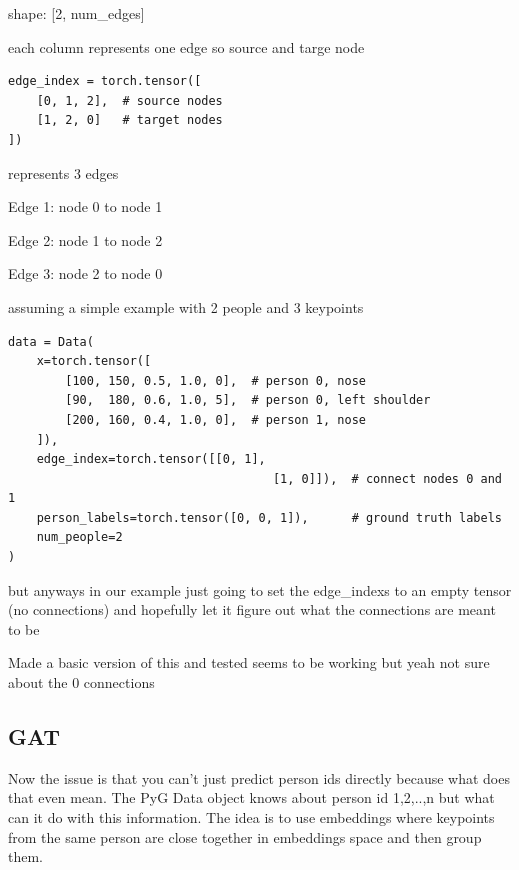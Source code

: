 \begin{compactitem}
	\item shape: [2, num\_edges] 
	\item each column represents one edge so source and targe node 
\end{compactitem}

\begin{lstlisting}[style=pythonstyle,title={PyG edges example},label={code:pyg_edges_example}]
edge_index = torch.tensor([
    [0, 1, 2],  # source nodes
    [1, 2, 0]   # target nodes  
])
\end{lstlisting}

represents 3 edges

\begin{compactitem}
	\item Edge 1: node 0 to node 1 
	\item Edge 2: node 1 to node 2 
	\item Edge 3: node 2 to node 0
\end{compactitem}

assuming a simple example with 2 people and 3 keypoints

\begin{lstlisting}[style=pythonstyle,title={PyG Data model simple example},label={code:pyg_simple_example}]
data = Data(
    x=torch.tensor([
        [100, 150, 0.5, 1.0, 0],  # person 0, nose
        [90,  180, 0.6, 1.0, 5],  # person 0, left shoulder  
        [200, 160, 0.4, 1.0, 0],  # person 1, nose
    ]),
    edge_index=torch.tensor([[0, 1],
									 [1, 0]]),  # connect nodes 0 and 1
    person_labels=torch.tensor([0, 0, 1]),      # ground truth labels
    num_people=2
)
\end{lstlisting}

but anyways in our example just going to set the edge\_indexs to an empty tensor (no connections)
and hopefully let it figure out what the connections are meant to be

Made a basic version of this and tested seems to be working but yeah not sure about the 0 connections

\subsection{GAT}

Now the issue is that you can't just predict person ids directly because what does that even mean.
The PyG Data object knows about person id 1,2,..,n but what can it do with this information.
The idea is to use embeddings where keypoints from the same person are close together in embeddings space
and then group them.

